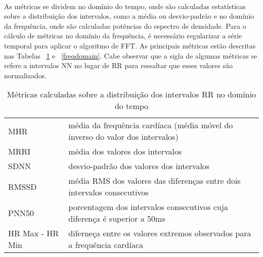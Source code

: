             \paragraph{} As métricas se dividem no domínio do tempo, onde são calculadas estatísticas sobre a distribuição dos intervalos, como a média ou desvio-padrão e no domínio da frequência, onde são calculadas potências do espectro de densidade. Para o cálculo de métricas no domínio da frequência, é necessário regularizar a série temporal para aplicar o algoritmo de FFT. As principais métricas estão descritas nas Tabelas ~\ref{timedomain} e ~\ref{freqdomain}.  Cabe observar que a sigla de algumas métricas se refere a intervalos NN no lugar de RR para ressaltar que esses valores são normalizados.

            \begin{table}[h!]
                \centering
                \caption{Métricas calculadas sobre a  distribuição dos intervalos RR no domínio do tempo}
                \label{timedomain}
                \begin{tabular}{l | p{8cm}}
                MHR & média da frequência cardíaca (média móvel do inverso do valor dos intervalos) \\
                MRRI  & média dos valores dos intervalos                             \\
                SDNN  & desvio-padrão dos valores dos intervalos                     \\
                RMSSD & média RMS dos valores das diferenças entre dois intervalos consecutivos \\
                PNN50 & porcentagem dos intervalos consecutivos cuja diferença é
                superior a 50ms \\
                HR Max - HR Min & diferneça entre os valores extremos observados para a frequência cardíaca \\
                \end{tabular}
            \end{table}

